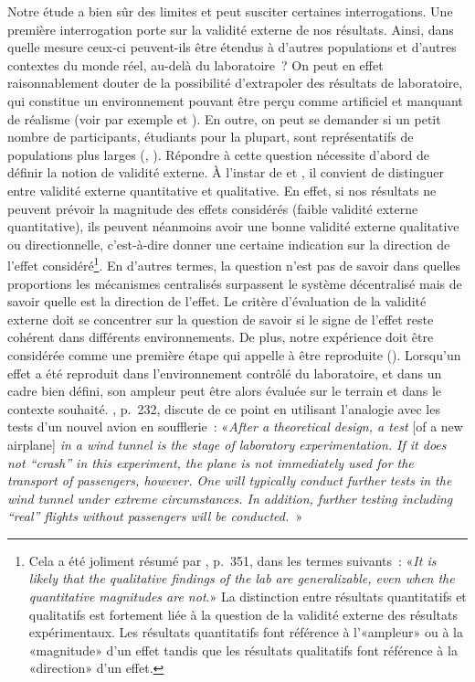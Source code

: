 \begin{Article}
\begin{refsection}[Lebourges]
Notre étude a bien sûr des limites et peut susciter certaines
interrogations. Une première interrogation porte sur la validité externe
de nos résultats. Ainsi, dans quelle mesure ceux-ci peuvent-ils
être étendus à d'autres populations et d'autres contextes du monde réel,
au-delà du laboratoire~? On peut en effet raisonnablement douter de la
possibilité d'extrapoler des résultats de laboratoire, qui constitue un
environnement pouvant être perçu comme artificiel et manquant de
réalisme (voir par exemple \textcite{BerkowitzDonnerstein1982} et
\textcite{Colquitt2008}). En outre, on peut se demander si un petit nombre
de participants, étudiants pour la plupart, sont représentatifs de
populations plus larges (\textcite{LevittList2007}, \textcite{LevittList2007-1}).
Répondre à cette question nécessite d'abord de définir la notion de
validité externe. À l'instar de \textcite{KesslerVesterlund2015} et
\textcite{LevittList2007}, il convient de distinguer entre validité
externe quantitative et qualitative. En effet, si nos résultats ne
peuvent prévoir la magnitude des effets considérés (faible validité
externe quantitative), ils peuvent néanmoins avoir une bonne validité
externe qualitative ou directionnelle, c'est-à-dire donner une certaine
indication sur la direction de l'effet considéré\footnote{Cela a été
  joliment résumé par \textcite{LevittList2007}, p.~351, dans les
  termes suivants~: «\emph{It is likely that the qualitative findings
  of the lab are generalizable, even when the quantitative magnitudes
  are not}.» La distinction entre résultats quantitatifs et qualitatifs
  est fortement liée à la question de la validité externe des résultats
  expérimentaux. Les résultats quantitatifs font référence à
  l'«ampleur» ou à la «magnitude» d'un effet tandis que les
  résultats qualitatifs font référence à la «direction» d'un effet.}.
En d'autres termes, la question n'est pas de savoir dans quelles
proportions les mécanismes centralisés surpassent le système
décentralisé mais de savoir quelle est la direction de l'effet. Le
critère d'évaluation de la validité externe doit se concentrer sur la
question de savoir si le signe de l'effet reste cohérent dans différents
environnements. De plus, notre expérience doit être considérée comme une
première étape qui appelle à être reproduite (\textcite{Camerer2015}).
Lorsqu'un effet a été reproduit dans l'environnement contrôlé du
laboratoire, et dans un cadre bien défini, son ampleur peut être alors
évaluée sur le terrain et dans le contexte souhaité. \textcite{Schram2005},
p.~232, discute de ce point en utilisant l'analogie avec les tests d'un
nouvel avion en soufflerie~: «\emph{After a theoretical design, a test}
[of a new airplane] \emph{in a wind tunnel is the stage of
laboratory experimentation. If it does not ``crash'' in this experiment,
the plane is not immediately used for the transport of passengers,
however. One will typically conduct further tests in the wind tunnel
under extreme circumstances. In addition, further testing including
``real'' flights without passengers will be conducted.~}»


\end{refsection}
\end{Article}

